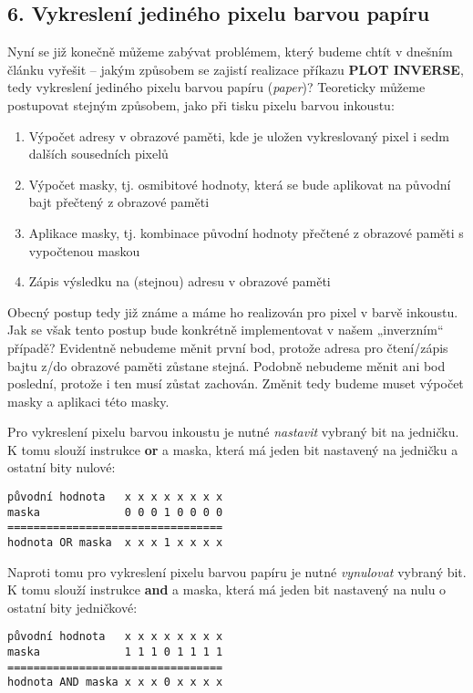 \documentclass{article}
\providecommand{\tightlist}{%
    \setlength{\itemsep}{0pt}\setlength{\parskip}{0pt}}
\begin{document}
\hypertarget{k06}{%
\subsection{6. Vykreslení jediného pixelu barvou papíru}\label{k06}}

Nyní se již konečně můžeme zabývat problémem, který budeme chtít v
dnešním článku vyřešit -- jakým způsobem se zajistí realizace příkazu
\textbf{PLOT INVERSE}, tedy vykreslení jediného pixelu barvou papíru
(\emph{paper})? Teoreticky můžeme postupovat stejným způsobem, jako při
tisku pixelu barvou inkoustu:

\begin{enumerate}
\tightlist
\item
  Výpočet adresy v obrazové paměti, kde je uložen vykreslovaný pixel i
  sedm dalších sousedních pixelů
\item
  Výpočet masky, tj. osmibitové hodnoty, která se bude aplikovat na
  původní bajt přečtený z obrazové paměti
\item
  Aplikace masky, tj. kombinace původní hodnoty přečtené z obrazové
  paměti s vypočtenou maskou
\item
  Zápis výsledku na (stejnou) adresu v obrazové paměti
\end{enumerate}

Obecný postup tedy již známe a máme ho realizován pro pixel v barvě
inkoustu. Jak se však tento postup bude konkrétně implementovat v našem
„inverzním`` případě? Evidentně nebudeme měnit první bod, protože adresa
pro čtení/zápis bajtu z/do obrazové paměti zůstane stejná. Podobně
nebudeme měnit ani bod poslední, protože i ten musí zůstat zachován.
Změnit tedy budeme muset výpočet masky a aplikaci této masky.

Pro vykreslení pixelu barvou inkoustu je nutné \emph{nastavit} vybraný
bit na jedničku. K tomu slouží instrukce \textbf{or} a maska, která má
jeden bit nastavený na jedničku a ostatní bity nulové:

\begin{verbatim}
původní hodnota   x x x x x x x x
maska             0 0 0 1 0 0 0 0
=================================
hodnota OR maska  x x x 1 x x x x
\end{verbatim}

Naproti tomu pro vykreslení pixelu barvou papíru je nutné
\emph{vynulovat} vybraný bit. K tomu slouží instrukce \textbf{and} a
maska, která má jeden bit nastavený na nulu o ostatní bity jedničkové:

\begin{verbatim}
původní hodnota   x x x x x x x x
maska             1 1 1 0 1 1 1 1
=================================
hodnota AND maska x x x 0 x x x x
\end{verbatim}
\end{document}
